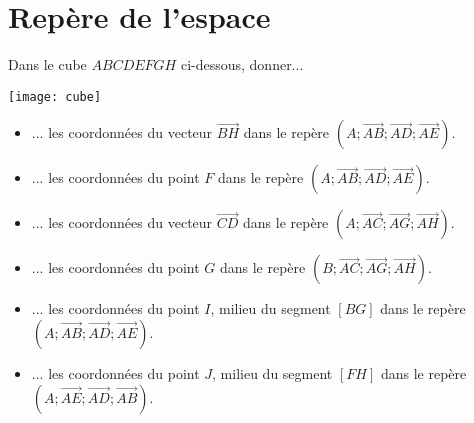 \documentclass[11pt,fleqn, openany]{book} %
\begin{document}

\section*{Repère de l'espace}

\begin{exercise}[topic=geo03]
Dans le cube $ABCDEFGH$ ci-dessous, donner...

\begin{minipage}{0.3\linewidth}
 \begin{center}
\texttt{[image: cube]}
\end{center}
\end{minipage}\hfill\begin{minipage}{0.65\linewidth}

\begin{itemize}
\item ... les coordonnées du vecteur $\overrightarrow{BH}$ dans le repère $(A;\overrightarrow{AB};\overrightarrow{AD};\overrightarrow{AE})$.
\vskip5pt
\item ... les coordonnées du point $F$ dans le repère $(A;\overrightarrow{AB};\overrightarrow{AD};\overrightarrow{AE})$.
\vskip5pt
\item ... les coordonnées du vecteur $\overrightarrow{CD}$ dans le repère $(A;\overrightarrow{AC};\overrightarrow{AG};\overrightarrow{AH})$.
\vskip5pt
\item ... les coordonnées du point $G$ dans le repère $(B;\overrightarrow{AC};\overrightarrow{AG};\overrightarrow{AH})$.
\vskip5pt
\item ...  les coordonnées du point $I$, milieu du segment $[BG]$ dans le repère $(A;\overrightarrow{AB};\overrightarrow{AD};\overrightarrow{AE})$.
\vskip5pt
\item ...  les coordonnées du point $J$, milieu du segment $[FH]$ dans le repère $(A;\overrightarrow{AE};\overrightarrow{AD};\overrightarrow{AB})$.
\end{itemize}
\end{minipage}\end{exercise}
\end{document}
